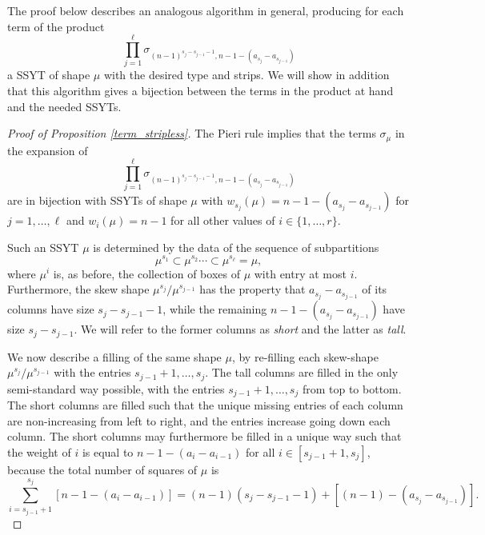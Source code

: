 The proof below describes an analogous algorithm in general, producing for each term of the product 
\begin{equation*}
 \prod_{j=1}^{\ell}\sigma_{(n-1)^{s_j-s_{j-1}-1},n-1-(a_{s_j}-a_{s_{j-1}})} 
 \end{equation*}
a SSYT of shape $\mu$ with the desired type and strips. We will show in addition that this algorithm gives a bijection between the terms in the product at hand and the needed SSYTs.

\begin{proof}[Proof of Proposition \ref{term_stripless}]
The Pieri rule implies that the terms $\sigma_\mu$ in the expansion of
\begin{equation*}
 \prod_{j=1}^{\ell}\sigma_{(n-1)^{s_j-s_{j-1}-1},n-1-(a_{s_j}-a_{s_{j-1}})} 
 \end{equation*}
 are in bijection with SSYTs of shape $\mu$ with $w_{s_j}(\mu)=n-1-(a_{s_j}-a_{s_{j-1}})$ for $j=1,\ldots,\ell$ and $w_{i}(\mu)=n-1$ for all other values of $i\in\{1,\ldots,r\}$.

Such an SSYT $\mu$ is determined by the data of the sequence of subpartitions
\begin{equation*}
\mu^{s_1}\subset\mu^{s_2}\cdots\subset\mu^{s_\ell}=\mu,
 \end{equation*}
where $\mu^i$ is, as before, the collection of boxes of $\mu$ with entry at most $i$. Furthermore, the skew shape $\mu^{s_j}/\mu^{s_{j-1}}$ has the property that $a_{s_j}-a_{s_{j-1}}$ of its columns have size $s_j-s_{j-1}-1$, while the remaining $n-1-(a_{s_j}-a_{s_{j-1}})$ have size $s_j-s_{j-1}$. We will refer to the former columns as \emph{short} and the latter as \emph{tall}. 

We now describe a filling of the same shape $\mu$, by re-filling each skew-shape $\mu^{s_j}/\mu^{s_{j-1}}$ with the entries $s_{j-1}+1,\ldots,s_j$. The tall columns are filled in the only semi-standard way possible, with the entries $s_{j-1}+1,\ldots,s_j$ from top to bottom. The short columns are filled such that the unique missing entries of each column are non-increasing from left to right, and the entries increase going down each column. The short columns may furthermore be filled in a unique way such that the weight of $i$ is equal to $n-1-(a_{i}-a_{i-1})$ for all $i\in[s_{j-1}+1,s_j]$, because the total number of squares of $\mu$ is
\begin{equation*}
\sum_{i=s_{j-1}+1}^{s_j}[n-1-(a_{i}-a_{i-1})]=(n-1)(s_j-s_{j-1}-1)+[(n-1)-(a_{s_j}-a_{s_{j-1}})].
\end{equation*}


\end{proof}
